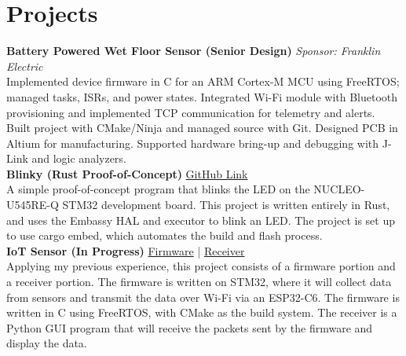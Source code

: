 \documentclass[11pt]{article}
\begin{document}

\section*{Projects}
\textbf{Battery Powered Wet Floor Sensor (Senior Design)} \hfill \textit{Sponsor: Franklin Electric}\\
	Implemented device firmware in C for an ARM Cortex-M MCU using FreeRTOS; managed tasks, ISRs, and power states.
	Integrated Wi-Fi module with Bluetooth provisioning and implemented TCP communication for telemetry and alerts.
	Built project with CMake/Ninja and managed source with Git. Designed PCB in Altium for manufacturing. Supported hardware bring-up and debugging with J-Link and logic analyzers.\\[0.25em]
\textbf{Blinky (Rust Proof-of-Concept)} \hfill \href{https://github.com/zaetep/blinky}{GitHub Link}\\
	A simple proof-of-concept program that blinks the LED on the NUCLEO-U545RE-Q STM32 development board. This project is written entirely in Rust, and uses the Embassy HAL and executor to blink an LED. The project is set up to use cargo embed, which automates the build and flash process.\\[0.25em]
\textbf{IoT Sensor (In Progress)} \hfill \href{https://github.com/zaetep/iot_sensor}{Firmware} | \href{https://github.com/zaetep/python_iot_receiver_gui}{Receiver}\\
	Applying my previous experience, this project consists of a firmware portion and a receiver portion. The firmware is written on STM32, where it will collect data from sensors and transmit the data over Wi-Fi via an ESP32-C6. The firmware is written in C using FreeRTOS, with CMake as the build system. The receiver is a Python GUI program that will receive the packets sent by the firmware and display the data.
\end{document}
